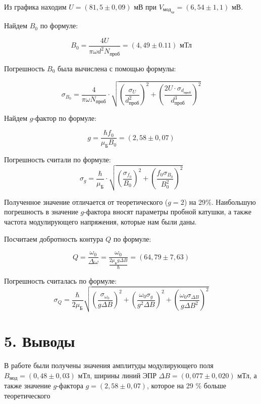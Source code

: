 \documentclass[a4paper,12pt]{report}
\begin{document}
Из графика находим $U = (81,5\pm0,09)$ мВ при $V_{\text{мод}_{\text{ср}}} = (6,54 \pm 1,1)$ мВ.


Найдем $B_{0}$ по формуле:

\begin{equation}
B_0=\frac{4U}{\pi\omega d^2N_{\text{проб}}}=(4,49\pm0.11)\text{ мТл}
\end{equation}


Погрешность $B_{0}$ была вычислена с помощью формулы:

\begin{equation*}
			\sigma_{B_{0}} = \frac{4}{\pi\omega N_{\text{проб}}}\cdot \sqrt{(\frac{\sigma_{U}}{d_{\text{проб}}^2})^2 + (\frac{2U\cdot\sigma_{d_{\text{проб}}}}{d_{\text{проб}}^3})^2}
		\end{equation*}		
		
Найдем $g$-фактор по формуле:

	\begin{equation}
		g = \frac{\hbar f_0}{\mu_\text{Б}B_{0}} = (2,58\pm0,07) 
	\end{equation}

Погрешность считали по формуле:
	\begin{equation}
		\sigma_{g} = \frac{\hbar}{\mu_\text{Б}} \cdot \sqrt{(\frac{\sigma_{f_{0}}}{B_{0}})^2 + (\frac{f_{0}\sigma_{B_{0}}}{B_{0}^2})^2}
	\end{equation}
	
Полученное значение отличается от теоретического ($g = 2$) на 29$\%$. Наибольшую погрешность в значение $g$-фактора вносят параметры пробной катушки, а также частота модулирующего напряжения, которые нам были даны.

Посчитаем добротность контура $Q$ по формуле:

	\begin{equation}
Q = \frac{\omega_{0}}{\Delta\omega} = \frac{\omega_{0}}{\frac{2\mu_{\text{Б}}g\Delta B}{\hbar}} = (64,79\pm7,63)
	\end{equation}
	
Погрешность считалась по формуле:
\begin{equation*}
    \sigma_{Q} = \frac{\hbar}{2\mu_{\text{Б}}}\sqrt{(\frac{\sigma_{\omega_{0}}}{g\Delta B})^2 + (\frac{\omega_{0}\sigma_{g}}{g^2 \Delta B})^2 + (\frac{\omega_{0}\sigma_{\Delta B}}{g\Delta B^2})^2}
\end{equation*}
	
\section*{5. Выводы}
В работе были получены значения амплитуды модулирующего поля $B_\text{мод}= (0,48\pm 0,03)\text{ мТл}$, ширины линий ЭПР $\Delta B = (0,077\pm0,020) \text{ мТл}$, а также значение $g$-фактора $g = (2,58\pm0,07) $, которое на 29 $\%$ больше теоретического
\end{document}
